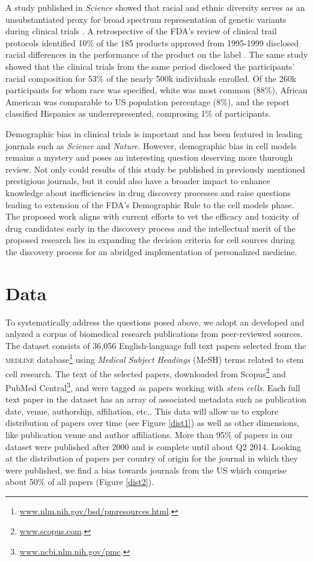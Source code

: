 \documentclass[10pt]{article}
\begin{document}
A study published in \textit{Science} showed that racial and ethnic diversity serves as an unsubstantiated proxy for broad spectrum representation of genetic variants during clinical trials \cite{haga2003fda}. A retrospective of the FDA's review of clinical trail protocols identified 10\% of the 185 products approved from 1995-1999 disclosed racial differences in the performance of the product on the label \cite{evelyn2001participation}. The same study showed that the clinical trials from the same period disclosed the participants' racial composition for 53\% of the nearly 500k individuals enrolled. Of the 260k participants for whom race was specified, white was most common (88\%), African American was comparable to US population percentage (8\%), and the report classified Hispanics as underrepresented, comprosing 1\% of participants.

Demographic bias in clinical trials is important and has been featured in leading journals such as \textit{Science} and \textit{Nature}. However, demographic bias in cell models remains a mystery and poses an interesting question deserving more thurough review. Not only could results of this study be published in previously mentioned prestigious journals, but it could also have a broader impact to enhance knowledge about inefficiencies in drug discovery processes and raise questions leading to extension of the FDA's Demographic Rule to the cell models phase. The proposed work aligns with current efforts to vet the efficacy and toxicity of drug candidates early in the discovery process and the intellectual merit of the proposed research lies in expanding the decision criteria for cell sources during the discovery process for an abridged implementation of personalized medicine.

\section{Data}

To systematically address the questions posed above, we adopt an developed and anlyzed a corpus of biomedical research publications from peer-reviewed sources. The dataset consists of 36,056 English-language full text papers selected from the \textsc{medline} database\footnote{\url{www.nlm.nih.gov/bsd/pmresources.html}.} using \textit{Medical Subject Headings} (MeSH) terms related to stem cell research. The text of the selected papers, downloaded from Scopus\footnote{\url{www.scopus.com}.} and PubMed Central\footnote{\url{www.ncbi.nlm.nih.gov/pmc}.}, and were tagged as papers working with \textit{stem cells}. Each full text paper in the dataset has an array of associated metadata such as publication date, venue, authorship, affiliation, etc.. This data will allow us to explore distribution of papers over time (see Figure \ref{dist1}) as well as other dimensions, like publication venue and author affiliations. More than 95\% of papers in our dataset were published after 2000 and is complete until about Q2 2014. Looking at the distribution of papers per country of origin for the journal in which they were published, we find a bias towards journals from the US which comprise about 50\% of all papers (Figure \ref{dist2}).
\end{document}
